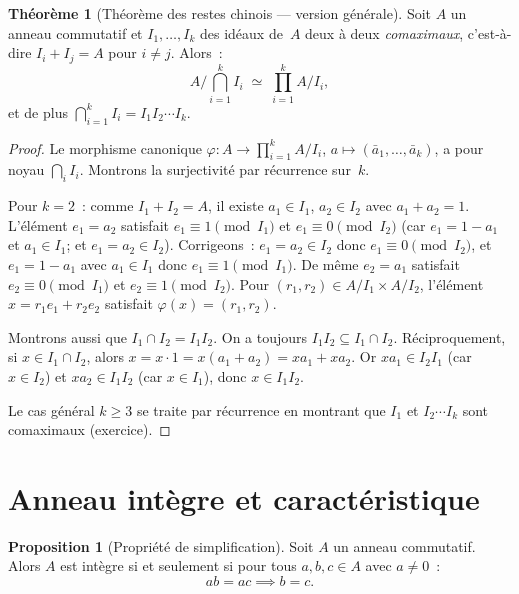 \documentclass[12pt,a4paper,openany]{book}
\theoremstyle{definition}
\newtheorem{theoreme}{Théorème}[chapter]
\newtheorem{proposition}{Proposition}[chapter]
\begin{document}
\begin{theoreme}[Théorème des restes chinois --- version générale]%
\label{thm:CRT-general}
Soit $A$ un anneau commutatif et $I_1, \ldots, I_k$ des idéaux de~$A$
deux à deux \emph{comaximaux}, c'est-à-dire
$I_i + I_j = A$ pour $i \neq j$. Alors~:
\[
  A\Big/\!\bigcap_{i=1}^{k} I_i \;\simeq\;
  \prod_{i=1}^{k} A/I_i,
\]
et de plus $\bigcap_{i=1}^{k} I_i = I_1 I_2 \cdots I_k$.
\end{theoreme}

\begin{proof}
Le morphisme canonique $\varphi \colon A \to \prod_{i=1}^{k} A/I_i$,
$a \mapsto (\bar{a}_1, \ldots, \bar{a}_k)$, a pour noyau
$\bigcap_{i} I_i$. Montrons la surjectivité par récurrence sur~$k$.

Pour $k = 2$~: comme $I_1 + I_2 = A$, il existe $a_1 \in I_1$,
$a_2 \in I_2$ avec $a_1 + a_2 = 1$. L'élément $e_1 = a_2$ satisfait
$e_1 \equiv 1 \pmod{I_1}$ et $e_1 \equiv 0 \pmod{I_2}$ (car
$e_1 = 1 - a_1$ et $a_1 \in I_1$; et $e_1 = a_2 \in I_2$).
Corrigeons~: $e_1 = a_2 \in I_2$ donc $e_1 \equiv 0 \pmod{I_2}$,
et $e_1 = 1 - a_1$ avec $a_1 \in I_1$ donc $e_1 \equiv 1 \pmod{I_1}$.
De même $e_2 = a_1$ satisfait $e_2 \equiv 0 \pmod{I_1}$ et
$e_2 \equiv 1 \pmod{I_2}$. Pour $(r_1, r_2) \in A/I_1 \times A/I_2$,
l'élément $x = r_1 e_1 + r_2 e_2$ satisfait $\varphi(x) = (r_1, r_2)$.

Montrons aussi que $I_1 \cap I_2 = I_1 I_2$. On a toujours
$I_1 I_2 \subseteq I_1 \cap I_2$. Réciproquement, si
$x \in I_1 \cap I_2$, alors $x = x \cdot 1 = x(a_1 + a_2)
= xa_1 + xa_2$. Or $xa_1 \in I_2 I_1$ (car $x \in I_2$) et
$xa_2 \in I_1 I_2$ (car $x \in I_1$), donc $x \in I_1 I_2$.

Le cas général $k \geqslant 3$ se traite par récurrence en montrant que
$I_1$ et $I_2 \cdots I_k$ sont comaximaux (exercice).
\end{proof}

\section{Anneau intègre et caractéristique}\label{sec:integre-caract}

\begin{proposition}[Propriété de simplification]\label{prop:simplification}
Soit $A$ un anneau commutatif. Alors $A$ est intègre si et seulement si
pour tous $a, b, c \in A$ avec $a \neq 0$~:
\[
  ab = ac \implies b = c.
\]
\end{proposition}
\end{document}
